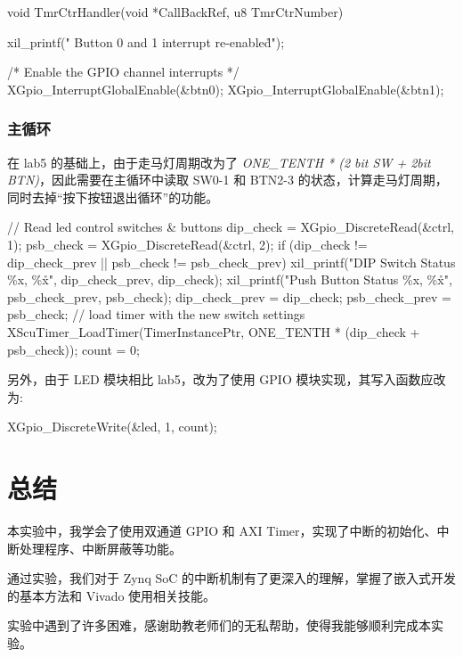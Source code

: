 \documentclass{sjtureport}
\begin{document}
\begin{codeblock}[language=C]
void TmrCtrHandler(void *CallBackRef, u8 TmrCtrNumber)
{
    xil_printf(" Button 0 and 1 interrupt re-enabled\r\n");

    /* Enable the GPIO channel interrupts */
    XGpio_InterruptGlobalEnable(&btn0);
    XGpio_InterruptGlobalEnable(&btn1);
}
\end{codeblock}

\subsection{主循环}

在 lab5 的基础上，由于走马灯周期改为了 \textit{ONE\_TENTH * (2 bit SW + 2bit BTN)}，因此需要在主循环中读取 SW0-1 和 BTN2-3 的状态，计算走马灯周期，同时去掉“按下按钮退出循环”的功能。

\begin{codeblock}[language=C]
// Read led control switches \& buttons
dip_check = XGpio_DiscreteRead(&ctrl, 1);
psb_check = XGpio_DiscreteRead(&ctrl, 2);
if (dip_check != dip_check_prev || psb_check != psb_check_prev)
{
	xil_printf("DIP Switch Status \%x, \%x\r\n",
				dip_check_prev, dip_check);
	xil_printf("Push Button Status \%x, \%x\r\n",
				psb_check_prev, psb_check);
	dip_check_prev = dip_check;
	psb_check_prev = psb_check;
	// load timer with the new switch settings
	XScuTimer_LoadTimer(TimerInstancePtr,
						ONE_TENTH * (dip_check + psb_check));
	count = 0;
}
\end{codeblock}

另外，由于 LED 模块相比 lab5，改为了使用 GPIO 模块实现，其写入函数应改为:

\begin{codeblock}[language=C]
XGpio_DiscreteWrite(&led, 1, count);
\end{codeblock}


\chapter{总结}

本实验中，我学会了使用双通道 GPIO 和 AXI Timer，实现了中断的初始化、中断处理程序、中断屏蔽等功能。

通过实验，我们对于 Zynq SoC 的中断机制有了更深入的理解，掌握了嵌入式开发的基本方法和 Vivado 使用相关技能。

实验中遇到了许多困难，感谢助教老师们的无私帮助，使得我能够顺利完成本实验。
\end{document}
